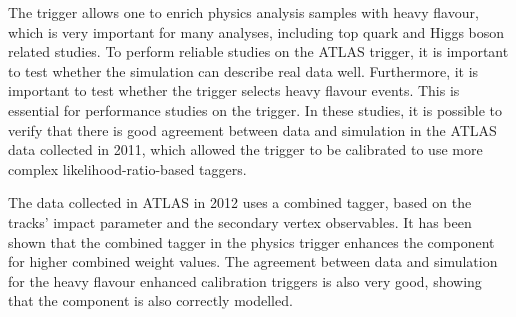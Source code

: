The \bjet trigger allows one to enrich physics analysis samples with heavy flavour, which is very important for many analyses,
including top quark and Higgs boson related studies.
To perform reliable studies on the ATLAS \bjet trigger, it is important to test whether the simulation can describe real data well.
Furthermore, it is important to test whether the trigger selects heavy flavour events. This is essential for performance studies on the \bjet trigger.
In these studies, it is possible to verify that there is good agreement between data and simulation in the ATLAS data collected in 2011, which allowed the \bjet
trigger to be calibrated to use more complex likelihood-ratio-based taggers.

The data collected in ATLAS in 2012 uses a combined tagger, based on the
tracks' impact parameter and the secondary vertex observables. It has been shown that the combined tagger in the physics trigger enhances the \bjet component
for higher combined weight values. The agreement between data and simulation for the heavy flavour enhanced calibration triggers is also very good, showing that the \bjet
component is also correctly modelled.

